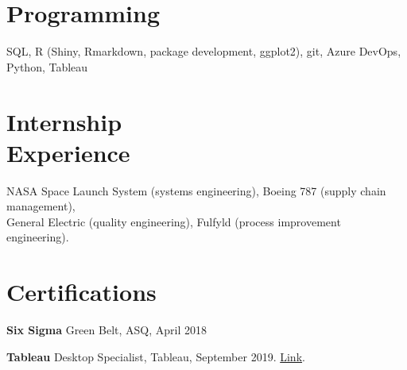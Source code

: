 \documentclass[margin, line]{res}
\begin{document}
\begin{resume}
\section{\sc Programming} 
SQL, R (Shiny, Rmarkdown, package development, ggplot2), git, Azure DevOps, Python, Tableau

\section{\sc Internship \\ Experience}
NASA Space Launch System (systems engineering), Boeing 787 (supply chain management), \\ General Electric (quality engineering), Fulfyld (process improvement engineering). 


\section{\sc Certifications }
{\bf Six Sigma} Green Belt, ASQ, April 2018
\vspace*{-3mm}

{\bf Tableau} Desktop Specialist, Tableau, September 2019. \href{https://www.credly.com/badges/e9a605a8-1977-4a1c-ab24-149a37c7fb36/linked_in_profile}{Link}.
\vspace*{-3mm}

\end{resume}
\end{document}
